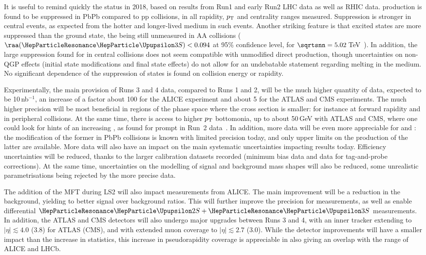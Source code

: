 \documentclass[../report.tex]{subfiles}
\begin{document}
It is useful to remind quickly the status in 2018, based on results from Run1 and early Run2 LHC data as well as RHIC data. \PGU production is found to be suppressed in PbPb compared to pp
collisions, in all rapidity, $p_{\rm T}$ and centrality ranges measured. Suppression is stronger in central events, as expected from the hotter and longer-lived medium in such events.
Another striking feature is that excited states are more suppressed than the ground state, the  being still unmeasured in AA collisions ($\raa(\PGUP{3S})<0.094$ at 95\% confidence
level, for $\sqrtsnn = 5.02$\,TeV~\cite{Sirunyan:2018nsz}). In addition, the large suppression found for  in central collisions does not seem compatible with unmodified direct  production,
though uncertainties on non-QGP effects (initial state modifications and final state effects) do not allow for an undebatable statement regarding  melting in the medium.
No significant dependence of the suppression of \PGU states is found on collision energy or rapidity.

Experimentally, the main provision of Runs 3 and 4 data, compared to Runs 1 and 2, will be the much higher quantity of data, expected to be 10\,nb$^{-1}$, an increase of a factor about
100 for the ALICE experiment %
and about 5 for the ATLAS and CMS experiments. The much higher precision will be most beneficial in regions of the phase space where the cross section is smaller: for instance at
forward rapidity and in peripheral collisions. At the same time, there is access to higher $p_{\rm T}$ bottomonia, up to about 50\,GeV with ATLAS and CMS, where one could look for hints of an
increasing \raa, as found for prompt \PJgy in Run~2 data~\cite{Sirunyan:2017isk,Aaboud:2018quy}. In addition, more data will be even more appreciable for  and : 
the modification of the former in PbPb collisions is known with limited precision today, and only upper limits on the production of the latter are available. More data will also have
an impact on the main systematic uncertainties impacting results today. Efficiency uncertainties will be reduced, thanks to the larger calibration datasets recorded (minimum bias data
and \PJgy data for tag-and-probe corrections). At the same time, uncertainties on the modelling of signal and background mass shapes will also be reduced, some unrealistic 
parametrisations being rejected by the more precise data.

The addition of the MFT during LS2 will also impact \PGU measurements from ALICE. The main improvement will be a reduction in the background, yielding to better signal over background
ratios. This will further improve the precision for  measurements, as well as enable differential $\PGUP{2S}+\PGUP{3S}$ measurements.
In addition, the ATLAS and CMS detectors will also undergo major upgrades between Runs 3 and 4, with an inner tracker
extending to $|\eta|\lesssim 4.0$ (3.8) for ATLAS (CMS), and with extended muon coverage to $|\eta|\lesssim 2.7$ (3.0). While the detector improvements will have a smaller impact than the
increase in statistics, this increase in pseudorapidity coverage is appreciable in also giving an overlap with the range of ALICE and LHCb.
\end{document}

